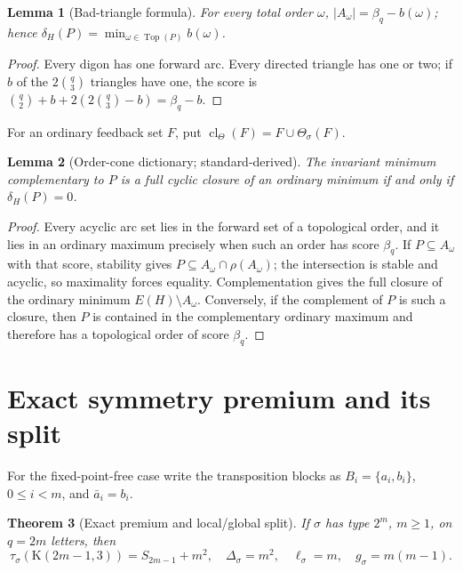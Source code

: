 \documentclass[11pt,a4paper]{article}
\newtheorem{theorem}{Theorem}[section]
\newtheorem{lemma}[theorem]{Lemma}
\theoremstyle{remark}
\newcommand{\Kautz}{\mathrm K}
\newcommand{\Top}{\operatorname{Top}}
\newcommand{\cl}{\operatorname{cl}}
\begin{document}
\begin{lemma}[Bad-triangle formula]
\label{lem:bad-triangle}
For every total order \(\omega\),
\(|A_\omega|=\beta_q-b(\omega)\); hence
\(\delta_H(P)=\min_{\omega\in\Top(P)}b(\omega)\).
\end{lemma}

\begin{proof}
Every digon has one forward arc.  Every directed triangle has one or two;
if \(b\) of the \(2\binom q3\) triangles have one, the score is
\(\binom q2+b+2(2\binom q3-b)=\beta_q-b\).
\end{proof}

For an ordinary feedback set \(F\), put
\(\cl_\Theta(F)=F\cup\Theta_\sigma(F)\).

\begin{lemma}[Order-cone dictionary; standard-derived]
\label{lem:order-cone}
The invariant minimum complementary to \(P\) is a full cyclic closure of an
ordinary minimum if and only if \(\delta_H(P)=0\).
\end{lemma}

\begin{proof}
Every acyclic arc set lies in the forward set of a topological order, and it
lies in an ordinary maximum precisely when such an order has score
\(\beta_q\).  If \(P\subseteq A_\omega\) with that score, stability gives
\(P\subseteq A_\omega\cap\rho(A_\omega)\); the intersection is stable and
acyclic, so maximality forces equality.  Complementation gives the full
closure of the ordinary minimum \(E(H)\setminus A_\omega\).  Conversely, if
the complement of \(P\) is such a closure, then \(P\) is contained in the
complementary ordinary maximum and therefore has a topological order of
score \(\beta_q\).
\end{proof}

\section{Exact symmetry premium and its split}
\label{sec:premium}

For the fixed-point-free case write the transposition blocks as
\(B_i=\{a_i,b_i\}\), \(0\leq i<m\), and \(\bar a_i=b_i\).

\begin{theorem}[Exact premium and local/global split]
\label{thm:premium}
If \(\sigma\) has type \(2^m\), \(m\geq1\), on \(q=2m\) letters, then
\[
 \tau_\sigma(\Kautz(2m-1,3))=S_{2m-1}+m^2,
 \quad \Delta_\sigma=m^2,
 \quad \ell_\sigma=m,
 \quad g_\sigma=m(m-1).
\]
\end{theorem}
\end{document}
